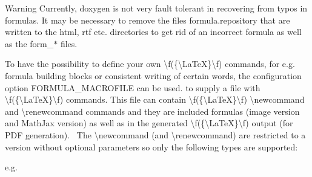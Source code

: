 \begin{DoxyWarning}{Warning}
Currently, doxygen is not very fault tolerant in recovering from typos in formulas. It may be necessary to remove the files {\ttfamily formula.\+repository} that are written to the html, rtf etc. directories to get rid of an incorrect formula as well as the {\ttfamily form\+\_\+$\ast$} files.
\end{DoxyWarning}
To have the possibility to define your own \textbackslash{}f(\{\textbackslash{}\+La\+TeX\}\textbackslash{}f) commands, for e.\+g. formula building blocks or consistent writing of certain words, the configuration option F\+O\+R\+M\+U\+L\+A\+\_\+\+M\+A\+C\+R\+O\+F\+I\+LE can be used. to supply a file with \textbackslash{}f(\{\textbackslash{}\+La\+TeX\}\textbackslash{}f) commands. This file can contain \textbackslash{}f(\{\textbackslash{}\+La\+TeX\}\textbackslash{}f) {\ttfamily \textbackslash{}newcommand} and {\ttfamily \textbackslash{}renewcommand} commands and they are included formulas (image version and Math\+Jax version) as well as in the generated \textbackslash{}f(\{\textbackslash{}\+La\+TeX\}\textbackslash{}f) output (for P\+DF generation).~\newline
 The {\ttfamily \textbackslash{}newcommand} (and {\ttfamily \textbackslash{}renewcommand}) are restricted to a version without optional parameters so only the following types are supported\+: 
\begin{DoxyCode}{0}
\end{DoxyCode}


e.\+g. 
\begin{DoxyCode}{0}
\end{DoxyCode}


 